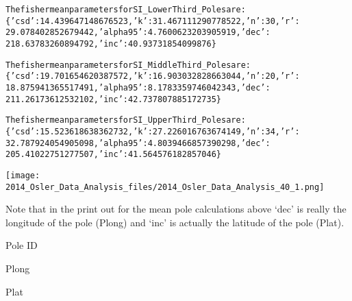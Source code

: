 \documentclass[letterpaper,10pt,english]{/Users/polarwander/Library/Enthought/Canopy_64bit/User/lib/python2.7/site-packages/sphinx/texinputs/sphinxhowto}
\newenvironment{InvisibleVerbatim}
        {\begin{mdframed}[leftmargin=0.1\linewidth,innerleftmargin=3pt,innerrightmargin=3pt, userdefinedwidth=1\linewidth, linewidth=0pt, linecolor=white, usetwoside=false]}
        {\end{mdframed}}
\begin{document}
    

        
        

            
                \begin{InvisibleVerbatim}
                \vspace{-0.5\baselineskip}
\begin{alltt}The fisher mean parameters for SI\_LowerThird\_Poles are:
\{'csd': 14.439647148676523, 'k': 31.467111290778522, 'n': 30, 'r':
29.078402852679442, 'alpha95': 4.7600623203905919, 'dec':
218.63783260894792, 'inc': 40.93731854099876\}

The fisher mean parameters for SI\_MiddleThird\_Poles are:
\{'csd': 19.701654620387572, 'k': 16.903032828663044, 'n': 20, 'r':
18.875941365517491, 'alpha95': 8.1783359746042343, 'dec':
211.26173612532102, 'inc': 42.737807885172735\}

The fisher mean parameters for SI\_UpperThird\_Poles are:
\{'csd': 15.523618638362732, 'k': 27.226016763674149, 'n': 34, 'r':
32.787924054905098, 'alpha95': 4.8039466857390298, 'dec':
205.41022751277507, 'inc': 41.564576182857046\}
\end{alltt}

            \end{InvisibleVerbatim}
            
                \begin{InvisibleVerbatim}
                \vspace{-0.5\baselineskip}
    \begin{center}
    \texttt{[image: 2014\_Osler\_Data\_Analysis\_files/2014\_Osler\_Data\_Analysis\_40\_1.png]}
    \par
    \end{center}
    
            \end{InvisibleVerbatim}
            
        
    
Note that in the print out for the mean pole calculations above `dec' is
really the longitude of the pole (Plong) and `inc' is actually the
latitude of the pole (Plat).

Pole ID

Plong

Plat
\end{document}
